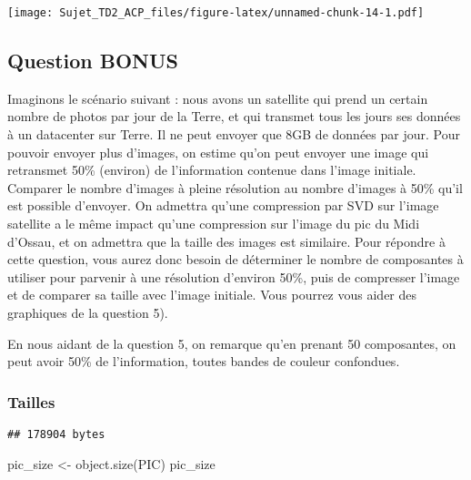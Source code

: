 \documentclass[
]{article}
\newenvironment{Shaded}{\begin{snugshade}}{\end{snugshade}}
\newcommand{\DecValTok}[1]{\textcolor[rgb]{0.00,0.00,0.81}{#1}}
\newcommand{\FunctionTok}[1]{\textcolor[rgb]{0.00,0.00,0.00}{#1}}
\newcommand{\NormalTok}[1]{#1}
\newcommand{\OtherTok}[1]{\textcolor[rgb]{0.56,0.35,0.01}{#1}}
\newcommand{\SpecialCharTok}[1]{\textcolor[rgb]{0.00,0.00,0.00}{#1}}
\begin{document}
\texttt{[image: Sujet\_TD2\_ACP\_files/figure-latex/unnamed-chunk-14-1.pdf]}

\hypertarget{question-bonus}{%
\subsection{Question BONUS}\label{question-bonus}}

Imaginons le scénario suivant : nous avons un satellite qui prend un
certain nombre de photos par jour de la Terre, et qui transmet tous les
jours ses données à un datacenter sur Terre. Il ne peut envoyer que 8GB
de données par jour. Pour pouvoir envoyer plus d'images, on estime qu'on
peut envoyer une image qui retransmet 50\% (environ) de l'information
contenue dans l'image initiale. Comparer le nombre d'images à pleine
résolution au nombre d'images à 50\% qu'il est possible d'envoyer. On
admettra qu'une compression par SVD sur l'image satellite a le même
impact qu'une compression sur l'image du pic du Midi d'Ossau, et on
admettra que la taille des images est similaire. Pour répondre à cette
question, vous aurez donc besoin de déterminer le nombre de composantes
à utiliser pour parvenir à une résolution d'environ 50\%, puis de
compresser l'image et de comparer sa taille avec l'image initiale. Vous
pourrez vous aider des graphiques de la question 5).

En nous aidant de la question 5, on remarque qu'en prenant 50
composantes, on peut avoir 50\% de l'information, toutes bandes de
couleur confondues.

\hypertarget{tailles}{%
\subsubsection{Tailles}\label{tailles}}

\begin{Shaded}
\end{Shaded}

\begin{verbatim}
## 178904 bytes
\end{verbatim}

\begin{Shaded}
\begin{Highlighting}[]
\NormalTok{pic\_size }\OtherTok{\textless{}{-}} \FunctionTok{object.size}\NormalTok{(PIC)}
\NormalTok{pic\_size}
\end{Highlighting}
\end{Shaded}
\end{document}
